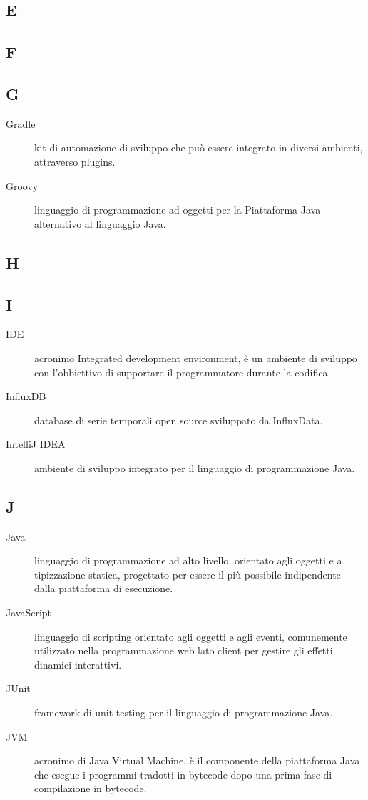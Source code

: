 \documentclass[../../../manuale.sviluppatore.tex]{subfiles}
\begin{document}
\subsection{E}

\subsection{F}

\subsection{G}

\begin{description}
    \item[Gradle] kit di automazione di sviluppo che può essere integrato in diversi ambienti, attraverso plugins.
    \item[Groovy] linguaggio di programmazione ad oggetti per la Piattaforma Java alternativo al linguaggio Java.
\end{description}

\subsection{H}

\subsection{I}

\begin{description}
    \item[IDE] acronimo Integrated development environment, è un ambiente di sviluppo con l'obbiettivo di supportare il programmatore durante la codifica.
    \item[InfluxDB] database di serie temporali open source sviluppato da InfluxData.  
    \item[IntelliJ IDEA] ambiente di sviluppo integrato per il linguaggio di programmazione Java.
\end{description}

\subsection{J}

\begin{description}
    \item[Java] linguaggio di programmazione ad alto livello, orientato agli oggetti e a tipizzazione statica, progettato per essere il più possibile indipendente dalla piattaforma di esecuzione.
    \item[JavaScript] linguaggio di scripting orientato agli oggetti e agli eventi, comunemente utilizzato nella programmazione web lato client per gestire gli effetti dinamici interattivi.
    \item[JUnit] framework di unit testing per il linguaggio di programmazione Java.
    \item[JVM] acronimo di Java Virtual Machine, è il componente della piattaforma Java che esegue i programmi tradotti in bytecode dopo una prima fase di compilazione in bytecode. 
\end{description}
\end{document}
